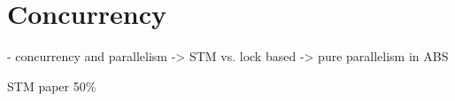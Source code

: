 \chapter{Concurrency}
- concurrency and parallelism
	-> STM vs. lock based
	-> pure parallelism in ABS


STM paper
50\%